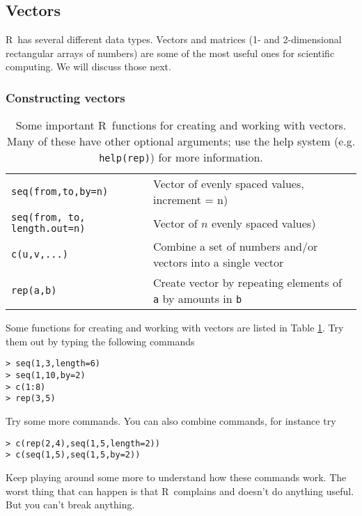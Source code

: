 \documentclass [11pt]{article}
\newcommand{\code}[1]{{\tt #1}}
\newcommand\R{{\sf R}}
\numberwithin{exercise}{section}
\begin{document}
\subsection{Vectors}
\R\ has several different data types. Vectors and matrices (1- and 2-dimensional rectangular arrays of 
numbers) are some of the most useful ones for scientific computing. We will discuss those next.



\subsubsection{Constructing vectors}
\begin{table}[tbh]
\begin{tabular}
{p{140pt}p{290pt}}
\hline
\code{seq(from,to,by=n)} & Vector of evenly spaced values, increment = n) \\
\code{seq(from, to, length.out=n)} & Vector of $n$ evenly spaced values) \\
\code{c(u,v,...) } & Combine a set of numbers and/or vectors into a single vector \\
\code{rep(a,b)} & Create vector by repeating elements of \code{a} by amounts in \code{b} \\
\hline
\end{tabular}
\caption{Some important \R\ functions for creating and working with vectors. Many of these have other optional
arguments; use the help system (e.g. \code{help(rep)}) for more information.}
\label{VectorFunctions}
\end{table}

Some functions for creating and working with vectors are listed in Table \ref{VectorFunctions}. 
Try them out by typing the following commands
\vspace{-0.1in}
\begin{verbatim}
> seq(1,3,length=6)
> seq(1,10,by=2)
> c(1:8)
> rep(3,5)
\end{verbatim}
\vspace{-0.1in}
Try some more commands. You can also combine commands, for instance try
\vspace{-0.1in}
\begin{verbatim}
> c(rep(2,4),seq(1,5,length=2))
> c(seq(1,5),seq(1,5,by=2))
\end{verbatim}
\vspace{-0.1in}
Keep playing around some more to understand how these commands work. 
The worst thing that can happen is that \R\ complains and doesn't do anything useful. But you can't break anything.
\end{document}
